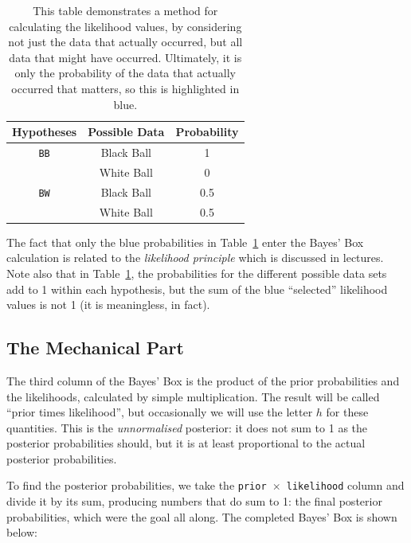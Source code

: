 \begin{table}[h!]
\begin{center}
\begin{tabular}{|c|c|c|}
\hline
{\bf Hypotheses} & {\bf Possible Data} & {\bf Probability} \\
\hline
{\tt BB} & {\color{blue} Black Ball} & {\color{blue} 1}\\
         & White Ball & 0 \\
\hline
{\tt BW} & {\color{blue} Black Ball} & {\color{blue} 0.5} \\
         & White Ball & 0.5 \\
\hline
\end{tabular}
\caption{This table demonstrates a method for calculating the likelihood
values, by considering not just the data that actually occurred, but all
data that might have occurred. Ultimately, it is only the probability of the
data that actually occurred that matters, so this is highlighted in blue.
\label{tab:all_data}}
\end{center}
\end{table}
The fact that only the blue probabilities in Table~\ref{tab:all_data} enter the
Bayes' Box calculation is related to the {\it likelihood principle} which is
discussed in lectures. Note also that in Table~\ref{tab:all_data}, the
probabilities for the different possible data sets add to 1 within each
hypothesis, but the sum of the blue ``selected'' likelihood values is not 1
(it is meaningless, in fact).

\subsection{The Mechanical Part}
The third column of the Bayes' Box is the product of the prior probabilities
and the likelihoods, calculated by simple multiplication. The result will be
called ``prior times likelihood'', but occasionally we will use the letter $h$
for these quantities. This is the {\it unnormalised} posterior: it does not sum
to 1 as the posterior probabilities should, but it is at least proportional to
the actual posterior probabilities.

To find the posterior probabilities, we take the {\tt prior $\times$ likelihood}
column and divide it by its sum, producing numbers that do sum to 1: the final
posterior probabilities, which were the goal all along. The completed Bayes'
Box is shown below:


